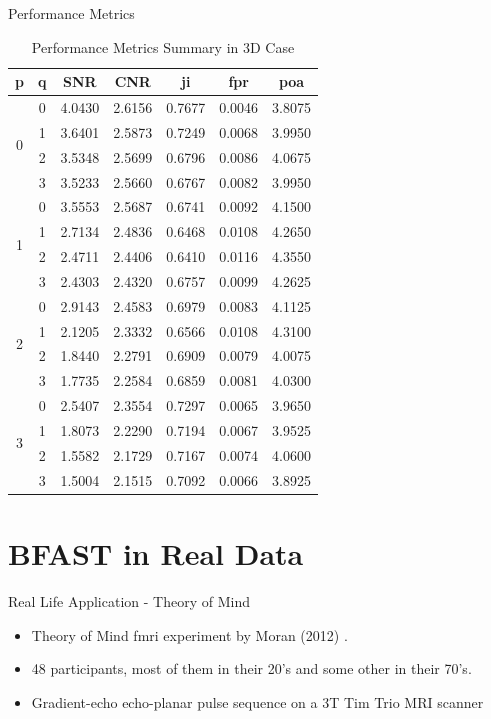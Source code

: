 \documentclass{beamer}
\begin{document}
\begin{frame}{Performance Metrics}
\begin{table}
\centering
\caption{Performance Metrics Summary in 3D Case}
\begin{tabular}{ccccccc}
\hline
\textbf{p} & \textbf{q} & \textbf{SNR} & \textbf{CNR} & \gls{ji} & \gls{fpr} & \gls{poa} \\ \hline
\multirow{4}{*}{0} & 0 & 4.0430 & 2.6156 & 0.7677 & 0.0046 & 3.8075 \\
 & 1 & 3.6401 & 2.5873 & 0.7249 & 0.0068 & 3.9950 \\
 & 2 & 3.5348 & 2.5699 & 0.6796 & 0.0086 & 4.0675 \\
 & 3 & 3.5233 & 2.5660 & 0.6767 & 0.0082 & 3.9950 \\ \hline
\multirow{4}{*}{1} & 0 & 3.5553 & 2.5687 & 0.6741 & 0.0092 & 4.1500 \\
 & 1 & 2.7134 & 2.4836 & 0.6468 & 0.0108 & 4.2650 \\
 & 2 & 2.4711 & 2.4406 & 0.6410 & 0.0116 & 4.3550 \\
 & 3 & 2.4303 & 2.4320 & 0.6757 & 0.0099 & 4.2625 \\ \hline
\multirow{4}{*}{2} & 0 & 2.9143 & 2.4583 & 0.6979 & 0.0083 & 4.1125 \\
 & 1 & 2.1205 & 2.3332 & 0.6566 & 0.0108 & 4.3100 \\
 & 2 & 1.8440 & 2.2791 & 0.6909 & 0.0079 & 4.0075 \\
 & 3 & 1.7735 & 2.2584 & 0.6859 & 0.0081 & 4.0300 \\ \hline
\multirow{4}{*}{3} & 0 & 2.5407 & 2.3554 & 0.7297 & 0.0065 & 3.9650 \\
 & 1 & 1.8073 & 2.2290 & 0.7194 & 0.0067 & 3.9525 \\
 & 2 & 1.5582 & 2.1729 & 0.7167 & 0.0074 & 4.0600 \\
 & 3 & 1.5004 & 2.1515 & 0.7092 & 0.0066 & 3.8925 \\ \hline
\end{tabular}
\end{table}
\end{frame}

\section{BFAST in Real Data}

\begin{frame}{Real Life Application - Theory of Mind}
\begin{itemize}
\item Theory of Mind \gls{fmri} experiment by Moran (2012) \cite{moran2012social}.
\item 48 participants, most of them in their 20's and some other in their 70's.
\item Gradient-echo echo-planar pulse sequence on a 3T Tim Trio MRI scanner
\end{itemize}
\end{frame}
\end{document}
